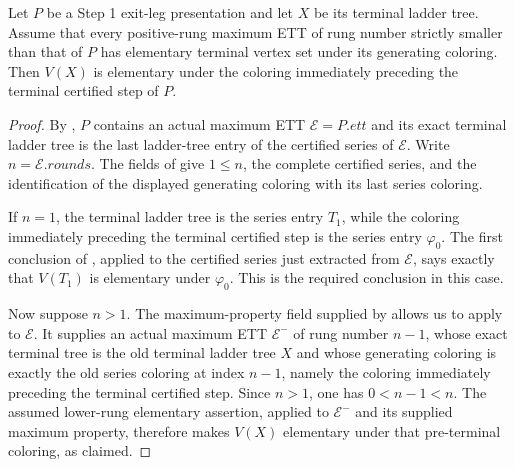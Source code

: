 \begin{lemma}
Let $P$ be a Step 1 exit-leg presentation and let $X$ be its terminal
ladder tree.  Assume that every positive-rung maximum ETT of rung number
strictly smaller than that of $P$ has elementary terminal vertex set
under its generating coloring.  Then $V(X)$ is elementary under the
coloring immediately preceding the terminal certified step of $P$.
\end{lemma}
\begin{proof}
By , $P$ contains an actual maximum
ETT $\mathcal E=P.\mathit{ett}$ and its exact terminal ladder tree is the
last ladder-tree entry of the certified series of $\mathcal E$.  Write
$n=\mathcal E.\mathit{rounds}$.  The fields of
 give $1\leq n$, the complete certified
series, and the identification of the displayed generating coloring
with its last series coloring.

If $n=1$, the terminal ladder tree is the series entry $T_1$, while the
coloring immediately preceding the terminal certified step is the
series entry $\varphi_0$.  The first conclusion of
, applied to the certified series just
extracted from $\mathcal E$, says exactly that $V(T_1)$ is elementary
under $\varphi_0$.  This is the required conclusion in this case.

Now suppose $n>1$.  The maximum-property field supplied by
 allows us to apply
 to $\mathcal E$.  It supplies an
actual maximum ETT $\mathcal E^-$ of rung number $n-1$, whose exact
terminal tree is the old terminal ladder tree $X$ and whose generating
coloring is exactly the old series coloring at index $n-1$, namely the
coloring immediately preceding the terminal certified step.  Since
$n>1$, one has $0<n-1<n$.  The assumed lower-rung elementary assertion,
applied to $\mathcal E^-$ and its supplied maximum property, therefore
makes $V(X)$ elementary under that pre-terminal coloring, as claimed.
\end{proof}
